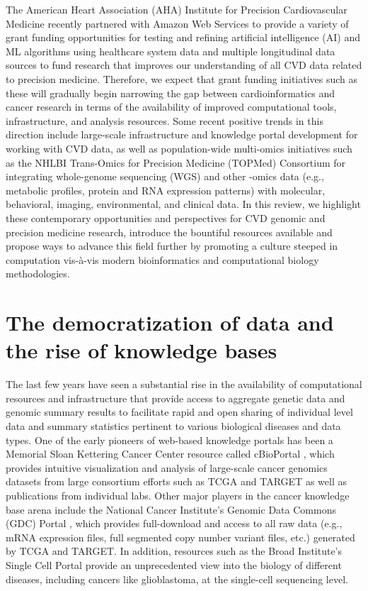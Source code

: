 \documentclass[letter]{bioinfo}
\begin{document}
The American Heart Association (AHA) Institute for Precision Cardiovascular Medicine recently partnered with Amazon Web Services to provide a variety of grant funding opportunities for testing and refining artificial intelligence (AI) and ML algorithms using healthcare system data and multiple longitudinal data sources to fund research that improves our understanding of all CVD data related to precision medicine.  Therefore, we expect that grant funding initiatives such as these will gradually begin narrowing the gap between cardioinformatics and cancer research in terms of the availability of improved computational tools, infrastructure, and analysis resources.  Some recent positive trends in this direction include large-scale infrastructure and knowledge portal development \citep{Kass-Hout:2018:American, Khomtchouk:2018:HeartBioPortal, Broad:NA:Cardiovascular, Broad:NA:Cerebrovascular} for working with CVD data, as well as population-wide multi-omics initiatives such as the NHLBI Trans-Omics for Precision Medicine (TOPMed) Consortium \citep{NHLBI:2014:TransOmics} for integrating whole-genome sequencing (WGS) and other -omics data (e.g., metabolic profiles, protein and RNA expression patterns) with molecular, behavioral, imaging, environmental, and clinical data.  In this review, we highlight these contemporary opportunities and perspectives for CVD genomic and precision medicine research, introduce the bountiful resources available and propose ways to advance this field further by promoting a culture steeped in computation vis-\`{a}-vis modern bioinformatics and computational biology methodologies.


\section*{The democratization of data and the rise of knowledge bases}

The last few years have seen a substantial rise in the availability of computational resources and infrastructure that provide access to aggregate genetic data and genomic summary results to facilitate rapid and open sharing of individual level data and summary statistics pertinent to various biological diseases and data types.  One of the early pioneers of web-based knowledge portals has been a Memorial Sloan Kettering Cancer Center resource called cBioPortal \citep{Cerami:2012:cBio,Gao:2013:Integrative}, which provides intuitive visualization and analysis of large-scale cancer genomics datasets from large consortium efforts such as TCGA \citep{TCGA:2013:Cancer} and TARGET \citep{Koscielny:2017:Open} as well as publications from individual labs.  Other major players in the cancer knowledge base arena include the National Cancer Institute's Genomic Data Commons (GDC) Portal \citep{Grossman:2016:Shared,Jensen:2017:NCI}, which provides full-download and access to all raw data (e.g., mRNA expression files, full segmented copy number variant files, etc.) generated by TCGA and TARGET.  In addition, resources such as the Broad Institute's Single Cell Portal \citep{Broad:NA:Single} provide an unprecedented view into the biology of different diseases, including cancers like glioblastoma, at the single-cell sequencing level.    
	
\end{document}
